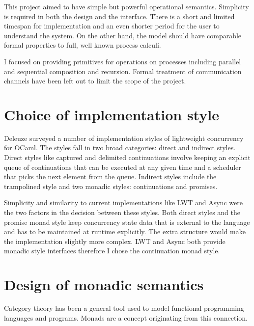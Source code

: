 \documentclass[12pt,twoside,notitlepage]{report}
\begin{document}

This project aimed to have simple but powerful operational semantics. Simplicity is required in both the design and the interface. There is a short and limited timespan for implementation and an even shorter period for the user to understand the system. On the other hand, the model should have comparable formal properties to full, well known process calculi. 

I focused on providing primitives for operations on processes including parallel and sequential composition and recursion. Formal treatment of communication channels have been left out to limit the scope of the project.  


\section{Choice of implementation style}  
Deleuze\cite{deleuzelight} surveyed a number of implementation styles of lightweight concurrency for OCaml. The styles fall in two broad categories: direct and indirect styles. Direct styles like captured and delimited continuations involve keeping an explicit queue of continuations that can be executed at any given time and a scheduler that picks the next element from the queue. Indirect styles include the trampolined style and two monadic styles: continuations and promises.

Simplicity and similarity to current implementations like LWT and Async were the two factors in the decision between these styles. Both direct styles and the promise monad style keep concurrency state data that is external to the language and has to be maintained at runtime explicitly. The extra structure would make the implementation slightly more complex. LWT and Async both provide monadic style interfaces therefore I chose the continuation monad style.





\section{Design of monadic semantics}
Category theory has been a general tool used to model functional programming languages and programs. Monads are a concept originating from this connection. 
\end{document}
